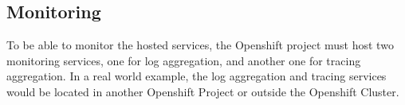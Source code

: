 \subsection{Monitoring}
\label{sec:esboc-requirements-oc-monitoring}
To be able to monitor the hosted services, the Openshift project must host two monitoring services, one for log aggregation, and another one for tracing aggregation. In a real world example, the log aggregation and tracing services would be located in another Openshift Project or outside the Openshift Cluster. 

